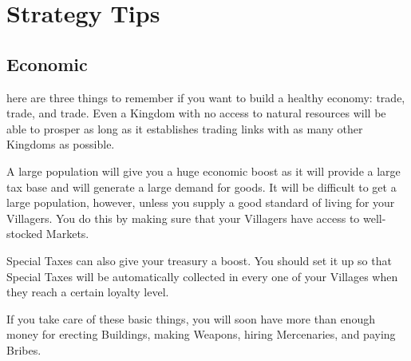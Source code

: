 
\chapter{Strategy Tips}


\section{Economic}



here are three things to remember if you want to build a healthy economy: trade, trade, and trade. Even a Kingdom with no access to natural resources will be able to prosper as long as it establishes trading links with as many other Kingdoms as possible.


A large population will give you a huge economic boost as it will provide a large tax base and will generate a large demand for goods. It will be difficult to get a large population, however, unless you supply a good standard of living for your Villagers. You do this by making sure that your Villagers have access to well-stocked Markets.

Special Taxes can also give your treasury a boost. You should set it up so that Special Taxes will be automatically collected in every one of your Villages when they reach a certain loyalty level.

If you take care of these basic things, you will soon have more than enough money for erecting Buildings, making Weapons, hiring Mercenaries, and paying Bribes.

